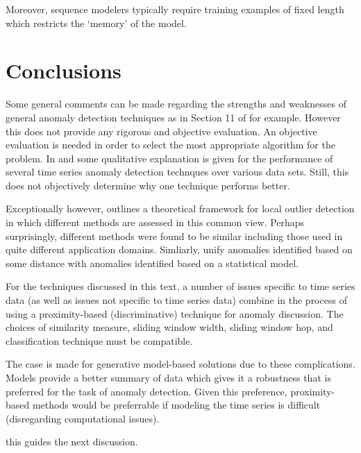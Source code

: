 Moreover, sequence modelers typically require training examples of fixed length which restricts the `memory' of the model.


\section{Conclusions} 

Some general comments can be made regarding the strengths and weaknesses of general anomaly detection techniques as in Section 11 of \cite{Chandola2009} for example. However this does not provide any rigorous and objective evaluation. An objective evaluation is needed in order to select the most appropriate algorithm for the problem. In \cite{Chandola2010} and \cite{Chandola2008} some qualitative explanation is given for the performance of several time series anomaly detection technques over various data sets. Still, this does not objectively determine why one technique performs better.

Exceptionally however, \cite{Schubert2014} outlines a theoretical framework for local outlier detection in which different methods are assessed in this common view. Perhaps surprisingly, different methods were found to be similar including those used in quite different application domains. Simliarly, \cite{knorr1997unified} unify anomalies identified based on some distance with anomalies identified based on a statistical model.

For the techniques discussed in this text, a number of issues specific to time series data (as well as issues not specific to time series data) combine in the process of using a proximity-based (discriminative) technique for anomaly discussion. The choices of similarity measure, sliding window width, sliding window hop, and classification technique must be compatible. 

The case is made for generative model-based solutions due to these complications. Models provide a better summary of data which gives it a robustness that is preferred for the task of anomaly detection. Given this preference, proximity-based methods would be preferrable if modeling the time series is difficult (disregarding computational issues).

this guides the next discussion.


